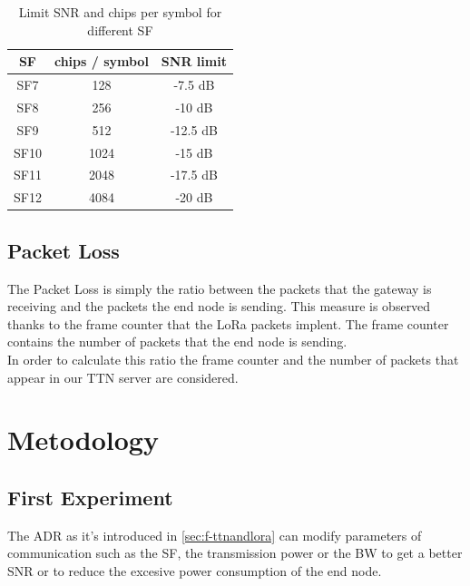 \begin{table}[htbp]
    \centering
    \setlength{\arrayrulewidth}{0.5mm}
    \setlength{\tabcolsep}{18pt}
    \renewcommand{\arraystretch}{2}
    \begin{tabular}{|c|c|c|}
        \hline
         \cellcolor[HTML]{85C1E9}SF & \cellcolor[HTML]{85C1E9}chips / symbol & \cellcolor[HTML]{85C1E9}SNR limit\\
         \hline
         SF7 & 128 & -7.5 dB\\
         SF8 & 256 & -10 dB\\
         SF9 & 512 & -12.5 dB\\
         SF10 & 1024 & -15 dB\\
         SF11 & 2048 & -17.5 dB\\
         SF12 & 4084 & -20 dB\\
         \hline
    \end{tabular}
    \caption{Limit SNR and chips per symbol for different SF}
    \label{tab:my_label}
\end{table}

\subsection{Packet Loss}
\label{chap4:packloss}

The Packet Loss is simply the ratio between the packets that the 
gateway is receiving and the packets the end node is sending.
This measure is observed thanks to the frame counter that the LoRa packets implent. 
The frame counter contains the number of packets that the end node is sending.\\
In order to calculate this ratio the frame counter and the number of packets that 
appear in our TTN server are considered.

\section{Metodology}
\label{chap4:metod}

\subsection{First Experiment}
\label{chap4:exp1}

The ADR as it's introduced in \ref{sec:f-ttnandlora} can modify parameters of communication 
such as the SF, the transmission power or the BW to get a better SNR or to 
reduce the excesive power consumption of the end node.\\

